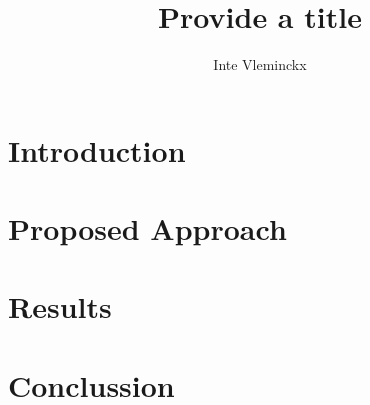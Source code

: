 \documentclass[we,final,11pt,oneside,openany]{uantwerpenbamathesis}
\title{Provide a title}
\author{Inte Vleminckx}
\begin{document}
\maketitle

\frontmatter

\tableofcontents

\mainmatter

\chapter{Introduction}
\label{ch:introduction}

\chapter{Proposed Approach}
\label{ch:proposed-approach}

\chapter{Results}
\label{ch:results}

\chapter{Conclussion}
\label{ch:conclussion}

\appendix



\end{document}
